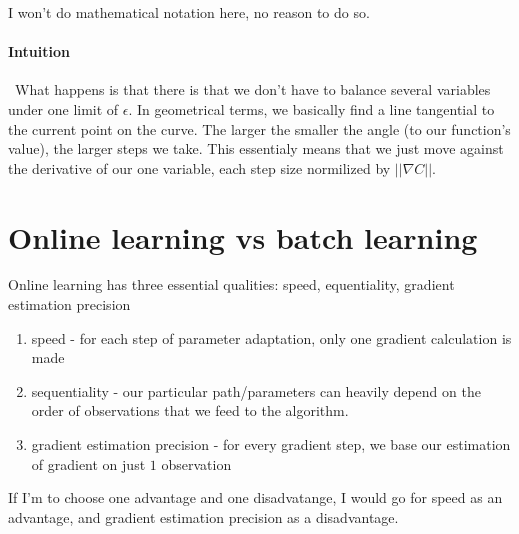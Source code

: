 \documentclass{article}
\begin{document}
I won't do mathematical notation here, no reason to do so.
\paragraph{Intuition}\
What happens is that there is that we don't have to balance several variables under one limit of $\epsilon$.
In geometrical terms, we basically find a line tangential to the current point on the curve.
The larger the smaller the angle (to our function's value), the larger steps we take.
This essentialy means that we just move against the derivative of our one variable, each step size normilized by $||{\nabla}C||$.

\section{Online learning vs batch learning}
Online learning has three essential qualities: speed, equentiality, gradient estimation precision
\begin{enumerate}
\item speed - for each step of parameter adaptation, only one gradient calculation is made
\item sequentiality - our particular path/parameters can heavily depend on the order of observations that we feed to the algorithm.
\item gradient estimation precision - for every gradient step, we base our estimation of gradient on just $1$ observation
\end{enumerate}
If I'm to choose one advantage and one disadvatange, I would go for speed as an advantage, and gradient estimation precision as a disadvantage.
\end{document}
